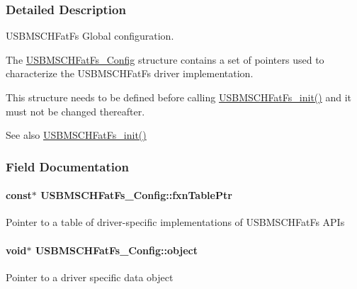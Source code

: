 \subsubsection{Detailed Description}
U\+S\+B\+M\+S\+C\+H\+Fat\+Fs Global configuration. 

The \hyperlink{struct_u_s_b_m_s_c_h_fat_fs___config}{U\+S\+B\+M\+S\+C\+H\+Fat\+Fs\+\_\+\+Config} structure contains a set of pointers used to characterize the U\+S\+B\+M\+S\+C\+H\+Fat\+Fs driver implementation.

This structure needs to be defined before calling \hyperlink{_u_s_b_m_s_c_h_fat_fs_8h_a70cc0939d4a838e87e3bb4742dae442e}{U\+S\+B\+M\+S\+C\+H\+Fat\+Fs\+\_\+init()} and it must not be changed thereafter.

\begin{DoxySeeAlso}{See also}
\hyperlink{_u_s_b_m_s_c_h_fat_fs_8h_a70cc0939d4a838e87e3bb4742dae442e}{U\+S\+B\+M\+S\+C\+H\+Fat\+Fs\+\_\+init()} 
\end{DoxySeeAlso}


\subsubsection{Field Documentation}
\paragraph[{fxn\+Table\+Ptr}]{ const$\ast$ U\+S\+B\+M\+S\+C\+H\+Fat\+Fs\+\_\+\+Config\+::fxn\+Table\+Ptr}\label{struct_u_s_b_m_s_c_h_fat_fs___config_a3a4cc2246f53d8c7aca196c20feeed7c}
Pointer to a table of driver-\/specific implementations of U\+S\+B\+M\+S\+C\+H\+Fat\+Fs A\+P\+Is 
\paragraph[{object}]{\setlength{\rightskip}{0pt plus 5cm}void$\ast$ U\+S\+B\+M\+S\+C\+H\+Fat\+Fs\+\_\+\+Config\+::object}\label{struct_u_s_b_m_s_c_h_fat_fs___config_ac7a9ff09f69fded788e34195c234f562}
Pointer to a driver specific data object 
